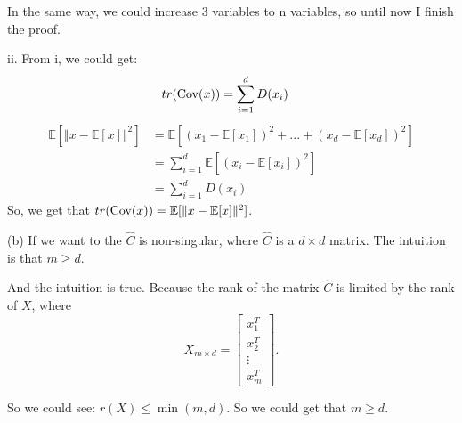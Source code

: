 \documentclass[a4paper]{article}
\begin{document}
In the same way, we could increase 3 variables to n variables, so until now I finish the proof.

ii. From i, we could get:
$$
\begin{aligned}
tr(\operatorname{Cov}(x)) &= \sum_{i=1}^d  D(x_i)
\end{aligned}
$$
$$
\begin{aligned}
\mathbb{E}[\Vert x - \mathbb{E}[x] \Vert^2] &= \mathbb E[(x_1-\mathbb{E}[x_1])^2 + ... +(x_d-\mathbb{E}[x_d])^2]\\
&= \sum_{i=1}^d \mathbb E [(x_i - \mathbb E[x_i])^2]\\
&= \sum_{i=1}^d D(x_i)
\end{aligned}
$$
So, we get that $ tr(\operatorname{Cov}(x)) =\mathbb{E}[\Vert x - \mathbb{E}[x] \Vert^2]  $.

(b) If we want to the $\hat C$ is non-singular, where $\hat C$ is a $d \times d$ matrix. The intuition is that $m\ge d$. 

And the intuition is true. Because the rank of the matrix $\hat C$ is limited by the rank of $X$, where
$$
X_{m \times d} = \begin{bmatrix}
x_1^T\\
x_2^T\\
\vdots\\
x_m^T
\end{bmatrix}.
$$

So we could see: $r(X) \leq \min(m,d)$. So we could get that $m \ge d$.
\end{document}
